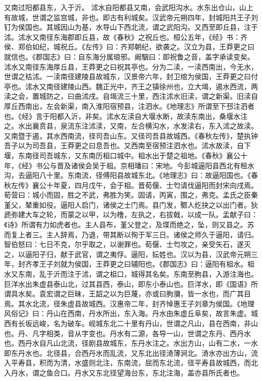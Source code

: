 \documentclass[12pt,UTF8]{ctexbook}
\begin{document}
又南过阳都县东，入于沂。
沭水自阳都县又南，会武阳沟水。水东出仓山，山上有故城，世谓之监宫城，非也。即古有利城矣。汉武帝元朔四年，封城阳共王子刘钉为侯国也。其城因山为基，水导山下西北流，谓之武阳沟。又西至即丘县，注于沭。沭水又南径东海郡即丘县，故《春秋》之祝丘也。桓公五年，《经》书：齐侯、郑伯如纪，城祝丘。《左传》曰：齐郑朝纪，欲袭之。汉立为县，王莽更之曰就信也。《郡国志》曰：自东海分属琅邪。阚駰曰：即祝鲁之音，盖字承读变矣。沭水又南径东海厚丘县，王莽更之曰祝其亭也。分为二渎，一渎西南出，今无水，世谓之枯沭。一渎南径建陵县故城东，汉景帝六年，封卫绾为侯国，王莽更之曰付亭也。沭水又南径建陵山西。魏正光中，齐王之镇徐州也，立大堨，遏水西流，两渎之会，置城防之，曰曲沭戌。自堨流三十里，西注沭水旧渎，谓之新渠。旧渎自厚丘西南出，左会新渠，南入淮阳宿预县，注泗水。《地理志》所谓至下邳注泗者也。《经》言于阳都入沂，非矣。沭水左渎自大堰水断，故渎东南出，桑堰水注之。水出襄贲县，泉流东注沭渎，又南，左合横沟水，水发渎右，东入沭之故渎。又南暨于遏，其水西南流，径司吾山东。又径司吾县故城西。《春秋左传》，楚执钟吾子以为司吾县，王莽更之曰息吾也。又西南至宿预注泗水也。沭水故渎，自下堰，东南径司吾城东，又东南历柤口城中。柤水出于楚之祖地。《春秋》襄公十年，《经》书公与晋及诸侯会吴于柤。京相璠曰：宋地。今彭城逼阳县西北有租水沟，去逼阳八十里。东南流，径傅阳县故城东北。《地理志》曰：故逼阳国也。《春秋左传》襄公十年夏，四月戊午，会于柤。晋荀偃、士匄请伐逼阳而封宋向戌焉。荀营曰：城小而固，胜之不武，弗胜为笑。固请，丙寅，围之，弗克。孟氏之臣秦堇父，辇重如役。逼阳人启门，诸侯之士门焉。县门发，鄹人纥抉之以出门者。狄虒弥建大车之轮，而蒙之以甲，以为橹，左执之，右拔戟，以成一队。盂献子曰：《诗》所谓有力如虎者也。主人县布，堇父登之，及堞而绝之，坠，则又县之。苏而复上者三。主人辞焉，乃退，带其断以徇于军三日。诸侯之师久于逼阳，请归。智伯怒曰：七日不克，尔乎取之，以谢罪也。荀偃、士匄攻之，亲受矢石，遂灭之，以逼阳子归，献于武官，谓之夷俘。逼阳，妘姓也。汉以为县，汉武帝元朔三年，封齐孝王子刘就为侯国，王莽更之曰辅阳也。《郡国志》曰：逼阳有柤水。柤水又东南，乱于沂而注于沭，谓之柤口，城得其名矣。东南至朐县，入游注海也。
巨洋水出朱虚县泰山北，过其县西，泰山，即东小泰山也。巨洋水，即《国语》所谓具水矣。袁宏谓之巨昧，王韶之以为巨蔑，亦或曰朐瀰，皆一水也，而广其目焉。其水北流，径朱虚县故城西。汉惠帝二年，封齐悼惠王子刘章为侯国。《地理风俗记》曰：丹山在西南，丹水所出，东入海。丹水由朱虚丘阜矣，故言朱虚。城西有长坂远峻，名为破车。岘城东北二十里有丹山，世谓之凡山，县在西南，非山也。丹、凡字相类，音从字变也。丹水有二源，各导一山，世谓之东丹、西丹水也。西丹水自凡山北流，径剧县故城东，东丹水注之。水出方山，山有二水，一水即东丹水也。北径县，合西丹水而乱流，又东北出径渏薄涧北。渏水亦出方山，流入平寿县，积而为清，水盛则北注，东南流，屈而东北流，径平寿县故城西，而北入丹水，谓之鱼合口。丹水又东北径望海台东，东北注海，盖亦县所氏者也。
\end{document}
